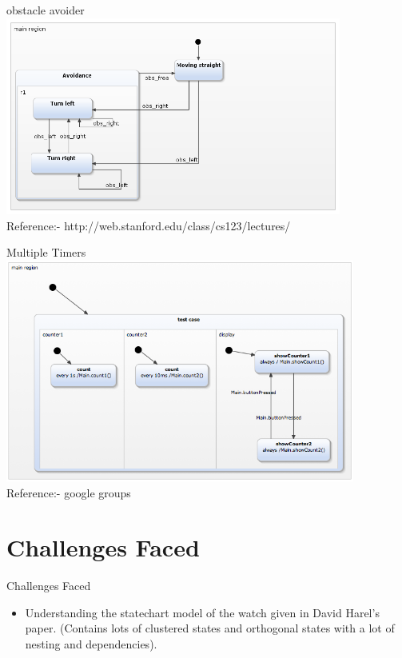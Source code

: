 \documentclass[10pt, a4paper]{beamer}
\begin{document}
\begin{frame}{obstacle avoider}
\includegraphics[width=11.04cm, height=6.5cm]{obstacle_avoider.png}
\\
Reference:- http://web.stanford.edu/class/cs123/lectures/
\end{frame}

\begin{frame}{Multiple Timers}
\includegraphics[width=11.48cm, height=7.3cm]{ortho.png}
\\
Reference:- google groups
\end{frame}

\section{Challenges Faced}
\begin{frame}{Challenges Faced}
	\begin{itemize}
		\item Understanding the statechart model of the watch given in David Harel's paper. (Contains lots of clustered states and orthogonal states with a lot of nesting and dependencies). 
	\end{itemize}
\end{frame}
\end{document}
